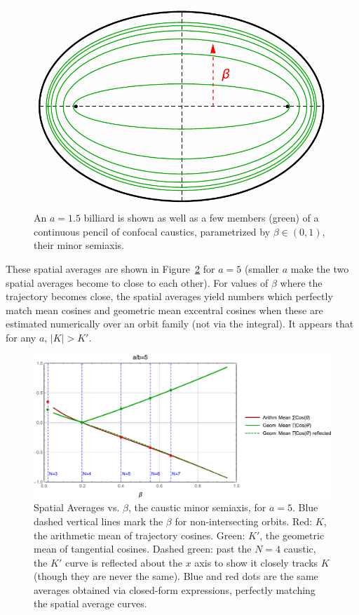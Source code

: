 \begin{figure}
    \centering
    \includegraphics[width=.5\textwidth]{pics/0175_caustic_pencil.pdf}
    \caption{An $a=1.5$ billiard is shown as well as a few members (green) of a continuous pencil of confocal caustics, parametrized by $\beta\in(0,1)$, their minor semiaxis.}
    \label{fig:gen-caustic-pencil}
\end{figure}

These spatial averages  are shown in Figure~\ref{fig:koiller-sum-prod} for $a=5$ (smaller $a$ make the two spatial averages become to close to each other). For values of $\beta$ where the trajectory becomes close, the spatial averages yield numbers which perfectly match mean cosines and geometric mean excentral cosines when these are estimated numerically over an orbit family (not via the integral). It appears that for any $a$, $|K|>K'$.

\begin{figure}
    \centering
\includegraphics[width=\textwidth]{pics/0172_koiller_sum_prod_a5.pdf}
    \caption{Spatial Averages vs. $\beta$, the caustic minor semiaxis, for $a=5$. Blue dashed vertical lines mark the $\beta$ for non-intersecting orbits. Red: $K$, the arithmetic mean of trajectory cosines. Green: $K'$, the geometric mean of tangential cosines. Dashed green: past the $N=4$ caustic, the $K'$ curve is reflected about the $x$ axis to show it closely tracks $K$ (though they are never the same). Blue and red dots are the same averages obtained via closed-form expressions, perfectly matching the spatial average curves.}
    \label{fig:koiller-sum-prod}
\end{figure}
